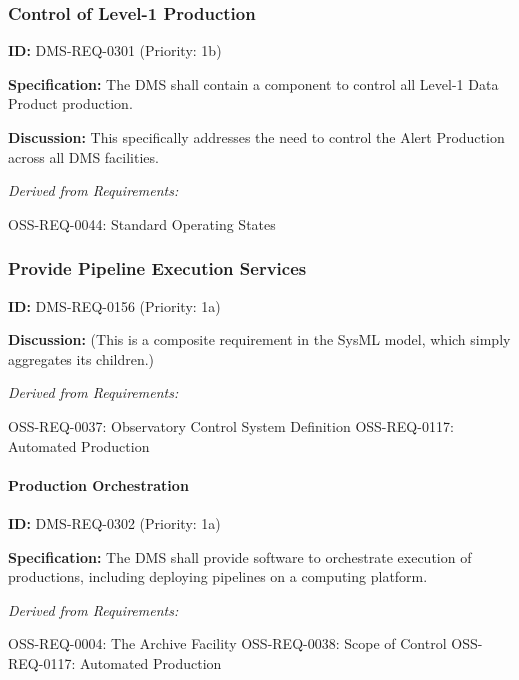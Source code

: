 \documentclass[SE,toc,lsstdraft]{lsstdoc}
\begin{document}
\subsubsection{Control of Level-1 Production}

\label{DMS-REQ-0301}
\textbf{ID:} DMS-REQ-0301 (Priority: 1b)

\textbf{Specification:} The DMS shall contain a component to control all Level-1 Data Product production.

\textbf{Discussion: }This specifically addresses the need to control the Alert Production across all DMS facilities.

\emph{Derived from Requirements:}

OSS-REQ-0044:
Standard Operating States \newline

\subsubsection{Provide Pipeline Execution Services}

\label{DMS-REQ-0156}
\textbf{ID:} DMS-REQ-0156 (Priority: 1a)

\textbf{Discussion:}
    (This is a composite requirement in the SysML model, which simply aggregates its children.)

\emph{Derived from Requirements:}

OSS-REQ-0037:
Observatory Control System Definition \newline
OSS-REQ-0117:
Automated Production \newline

\paragraph{Production Orchestration}\hfill  %

\label{DMS-REQ-0302}
\textbf{ID:} DMS-REQ-0302 (Priority: 1a)

\textbf{Specification:} The DMS shall provide software to orchestrate execution of productions, including deploying pipelines on a computing platform.

\emph{Derived from Requirements:}

OSS-REQ-0004:
The Archive Facility \newline
OSS-REQ-0038:
Scope of Control \newline
OSS-REQ-0117:
Automated Production \newline
\end{document}
